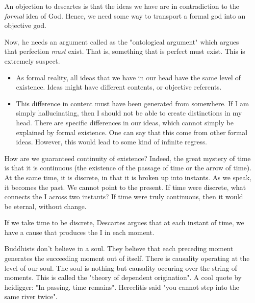 \documentclass[11pt]{book}
\begin{document}
An objection to descartes is that the ideas we have are in contradiction to the
\textit{formal} idea of God. Hence, we need some way to transport a formal god
into an objective god.

Now, he needs an argument called as the "ontological argument" which argues
that perfection \textit{must} exist.  That is, something that is perfect must
exist. This is extremely suspect.

\begin{itemize}
    \item As formal reality, all ideas that we have in our head have the same level of existence.
          Ideas might have different contents, or objective referents.
    \item This difference in content must have been generated from somewhere. If I am
        simply hallucinating, then I should not be able to create distinctions in my head.
        There are specific differences in our ideas, which cannot simply
        be explained by formal existence. One can say that this come from
        other formal ideas. However, this would lead to some kind of infinite regress.
\end{itemize}


How are we guaranteed continuity of existence? Indeed, the great mystery of
time is that it is continuous (the existence of the passage of time or the
arrow of time).  At the same time, it is discrete,  in that it is broken up
into instants. As we speak, it becomes the past. We cannot point to the
present. If time were discrete, what connects the I across two instants?
If time were truly continuous, then it would be eternal, without change.


If we take time to be discrete, Descartes argues that at each instant of time,
we have a cause that produces the I in each moment. 

Buddhists don't believe in a soul. They believe that each preceding moment 
generates the succeeding moment out of itself. There is causality operating
at the level of our soul. The soul is nothing but causality occuring over
the string of moments. This is called the "theory of dependent origination".
A cool quote by heidigger: "In passing, time remains". Hereclitis said "you
cannot step into the same river twice".
\end{document}
